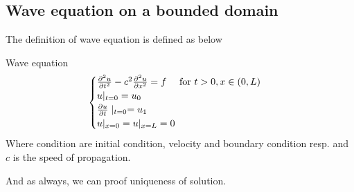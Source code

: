 \subsection{Wave equation on a bounded domain}
The definition of wave equation is defined as below 
\begin{definition}{Wave equation}
	\begin{align*} 
		\begin{cases}
			\frac{\partial^2 u}{\partial t^2} - c^2 \frac{\partial^2 u}{\partial x^2}  = f \mathspace \text{ for } t > 0, x \in \left(0, L\right)\\
			u|_{t= 0} = u_0\\
			\frac{\partial u}{\partial t} \mid_{t= 0}= u_1\\
			u|_{x= 0}= u|_{x= L} = 0
		\end{cases} 
	\end{align*}
	Where condition are initial condition, velocity and boundary condition resp. and $c$ is the speed of propagation.
\end{definition}
And as always, we can proof uniqueness of solution. 
